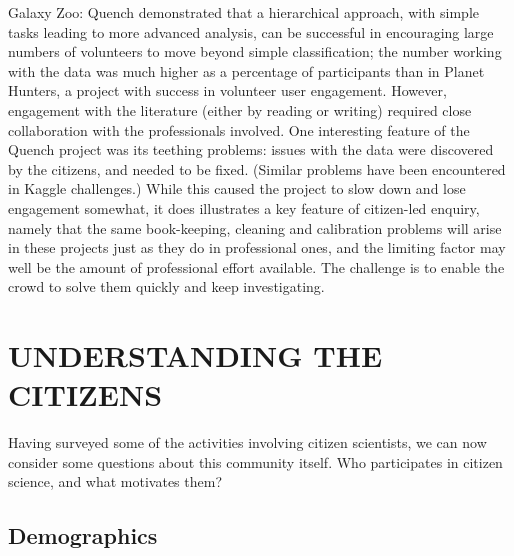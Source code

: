 \documentclass{ar2e}
\begin{document}
Galaxy Zoo: Quench demonstrated that a hierarchical approach, with simple tasks
leading to more advanced analysis, can be successful in encouraging large
numbers of volunteers to move beyond simple classification; the number
working with the data was much higher as a percentage of
participants than in Planet Hunters, a project with success in volunteer user engagement. 
However, engagement with the literature
(either by reading or writing) required close collaboration with the
professionals involved. One interesting feature of the Quench project was its
teething problems: issues with the data were discovered by the citizens, and
needed to be fixed. (Similar problems have been encountered in Kaggle
challenges.) While this caused the project to slow down and lose engagement
somewhat, it does illustrates a key feature of citizen-led enquiry, namely that the
same book-keeping, cleaning and calibration problems will arise in these
projects just as they do in professional ones, and the limiting factor may well be the 
amount of professional effort available. The challenge is to enable the
crowd to solve them quickly and keep investigating.


\section{UNDERSTANDING THE CITIZENS}
\label{sec:crowd}

Having surveyed some of the activities involving citizen scientists, we can
now consider some questions about this community itself. Who participates in
citizen science, and what motivates them?



\subsection{Demographics}
\label{sec:crowd:demographics}
\end{document}
